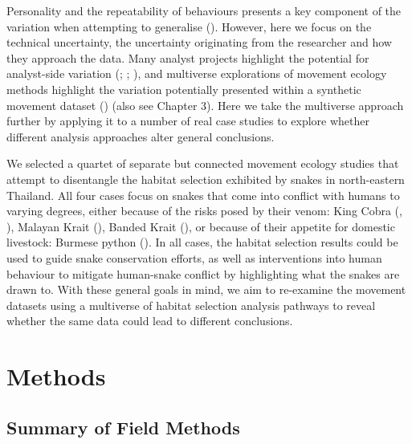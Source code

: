 \documentclass[10pt,a4paper]{article}
\begin{document}
Personality and the repeatability of behaviours presents a key component of the variation when attempting to generalise ().
However, here we focus on the technical uncertainty, the uncertainty originating from the researcher and how they approach the data.
Many analyst projects highlight the potential for analyst-side variation (; ; ), and multiverse explorations of movement ecology methods highlight the variation potentially presented within a synthetic movement dataset () (also see Chapter 3).
Here we take the multiverse approach further by applying it to a number of real case studies to explore whether different analysis approaches alter general conclusions.

We selected a quartet of separate but connected movement ecology studies that attempt to disentangle the habitat selection exhibited by snakes in north-eastern Thailand.
All four cases focus on snakes that come into conflict with humans to varying degrees, either because of the risks posed by their venom: King Cobra (, ), Malayan Krait (), Banded Krait (), or because of their appetite for domestic livestock: Burmese python ().
In all cases, the habitat selection results could be used to guide snake conservation efforts, as well as interventions into human behaviour to mitigate human-snake conflict by highlighting what the snakes are drawn to.
With these general goals in mind, we aim to re-examine the movement datasets using a multiverse of habitat selection analysis pathways to reveal whether the same data could lead to different conclusions.

\section{Methods}\label{methods}

\subsection{Summary of Field Methods}\label{summary-of-field-methods}
\end{document}
